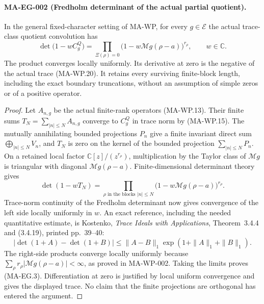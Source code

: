 \paragraph{MA-EG-002 (Fredholm determinant of the actual partial quotient).}
In the general fixed-character setting of MA-WP, for every
$g\in\mathcal E$ the actual trace-class quotient convolution has
\[
 \det\bigl(1-wC_g^Q\bigr)
       =\prod_{\Xi(\rho)=0}
           \bigl(1-w\mathcal Mg(\rho-a)\bigr)^{r_\rho},
 \qquad w\in\mathbb C.
 \tag{MA-EG.3}
\]
The product converges locally uniformly. Its derivative at zero
is the negative of the actual trace (MA-WP.20).
It retains every surviving finite-block length, including the exact
boundary truncations, without an assumption of simple zeros or of
a positive operator.

\begin{proof}
Let $A_{n,g}$ be the actual finite-rank operators (MA-WP.13).
Their finite sums $T_N=\sum_{|n|\le N}A_{n,g}$ converge to
$C_g^Q$ in trace norm by (MA-WP.15).
The mutually annihilating bounded projections $P_n$ give a finite
invariant direct sum $\bigoplus_{|n|\le N}V_n$, and $T_N$ is
zero on the kernel of the bounded projection
$\sum_{|n|\le N}P_n$. On a retained local factor
$\mathbb C[z]/(z^{r_\rho})$, multiplication by the Taylor class
of $\mathcal Mg$ is triangular with diagonal
$\mathcal Mg(\rho-a)$. Finite-dimensional determinant theory gives
\[
 \det(1-wT_N)=
   \prod_{\rho\text{ in the blocks }|n|\le N}
        \bigl(1-w\mathcal Mg(\rho-a)\bigr)^{r_\rho}.
\]
Trace-norm continuity of the Fredholm determinant now gives
convergence of the left side locally uniformly in $w$.
An exact reference, including the needed quantitative estimate,
is Kostenko, \emph{Trace Ideals with Applications},
Theorem~3.4.4 and (3.4.19), printed pp.~39--40:
\[
 |\det(1+A)-\det(1+B)|
       \le\|A-B\|_1\exp(1+\|A\|_1+\|B\|_1).
\]
The right-side products converge locally uniformly because
$\sum_\rho r_\rho|\mathcal Mg(\rho-a)|<\infty$, as proved
in MA-WP-002. Taking the limits proves (MA-EG.3).
Differentiation at zero is justified by local uniform convergence
and gives the displayed trace. No claim that the finite projections
are orthogonal has entered the argument.
\end{proof}

